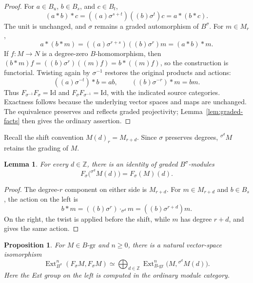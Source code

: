 \documentclass[11pt,a4paper]{article}
\numberwithin{equation}{section}
\theoremstyle{definition}
\theoremstyle{plain}
\newtheorem{proposition}[definition]{Proposition}
\newtheorem{lemma}[definition]{Lemma}
\theoremstyle{remark}
\DeclareMathOperator{\Ext}{Ext}
\newcommand{\Z}{\mathbb Z}
\newcommand{\gmod}[1]{#1\text{-}\mathrm{gr}}
\newcommand{\tw}[2]{{}^{#1}\!#2}
\newcommand{\Id}{\mathrm{Id}}
\begin{document}
\begin{proof}
For \(a\in B_u\), \(b\in B_s\), and \(c\in B_t\),
\[
 (a*b)*c=((a)\sigma^{s+t})((b)\sigma^t)c=a*(b*c).
\]
The unit is unchanged, and \(\sigma\) remains a graded automorphism
of \(B^\sigma\). For \(m\in M_r\),
\[
 a*(b*m)=((a)\sigma^{r+s})((b)\sigma^r)m=(a*b)*m.
\]
If \(f:M\to N\) is a degree-zero \(B\)-homomorphism, then
\((b*m)f=((b)\sigma^r)((m)f)=b*((m)f)\), so the construction is
functorial. Twisting again by \(\sigma^{-1}\) restores the original
products and actions:
\[
 ((a)\sigma^{-t})*b=ab,
 \qquad ((b)\sigma^{-r})*m=bm.
\]
Thus \(F_{\sigma^{-1}}F_\sigma=\Id\) and
\(F_\sigma F_{\sigma^{-1}}=\Id\), with the indicated source categories.
Exactness follows because the underlying vector spaces and maps are
unchanged. The equivalence preserves and reflects graded projectivity;
Lemma~\ref{lem:graded-facts} then gives the ordinary assertion.
\end{proof}

Recall the shift convention \(M(d)_r=M_{r+d}\). Since \(\sigma\)
preserves degrees, \(\tw{\sigma^d}{M}\) retains the grading of \(M\).

\begin{lemma}\label{lem:shift-twist}
For every \(d\in\Z\), there is an identity of graded
\(B^\sigma\)-modules
\begin{equation*}
 F_\sigma\bigl(\tw{\sigma^d}{M}(d)\bigr)=F_\sigma(M)(d).
\end{equation*}
\end{lemma}

\begin{proof}
The degree-\(r\) component on either side is \(M_{r+d}\).
For \(m\in M_{r+d}\) and \(b\in B_s\), the action on the left is
\[
 b*m=((b)\sigma^r)\cdot_{\sigma^d}m
     =((b)\sigma^{r+d})m.
\]
On the right, the twist is applied before the shift, while \(m\) has
degree \(r+d\), and gives the same action.
\end{proof}

\begin{proposition}\label{prop:twisted-Ext}
For \(M\in\gmod{B}\) and \(n\geq0\), there is a natural
vector-space isomorphism
\begin{equation}\label{eq:twisted-Ext}
 \Ext_{B^\sigma}^n(F_\sigma M,F_\sigma M)
 \simeq
 \bigoplus_{d\in\Z}
 \Ext_{\gmod{B}}^n\bigl(M,\tw{\sigma^d}{M}(d)\bigr).
\end{equation}
Here the Ext group on the left is computed in the ordinary module
category.
\end{proposition}
\end{document}

